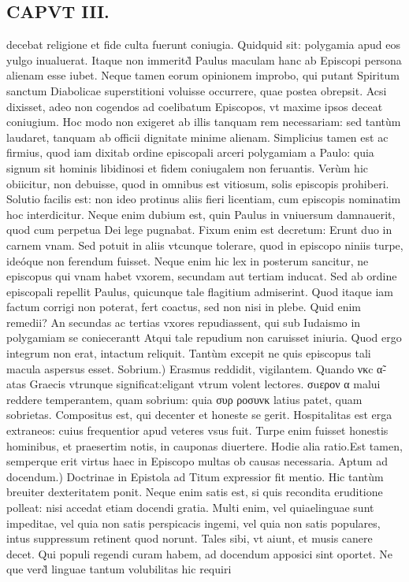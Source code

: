 \documentclass{article}
\begin{document}
\begin{pages}
\section*{CAPVT III. }
\marginpar{[ p.33 ]}\pstart decebat religione et fide culta fuerunt coniugia. Quidquid sit: polygamia apud eos yulgo inualuerat. Itaque non immeritd̀ Paulus maculam hanc ab Episcopi persona alienam esse iubet. Neque tamen eorum opinionem improbo, qui putant Spiritum sanctum Diabolicae superstitioni voluisse occurrere, quae postea obrepsit. Acsi dixisset, adeo non cogendos ad coelibatum Episcopos, vt maxime ipsos deceat coniugium. Hoc modo non exigeret ab illis tanquam rem necessariam: sed tantùm laudaret, tanquam ab officii dignitate minime alienam. Simplicius tamen est ac firmius, quod iam dixitab ordine episcopali arceri polygamiam a Paulo: quia signum sit hominis libidinosi et fidem coniugalem non feruantis. Verùm hic obiicitur, non debuisse, quod in omnibus est vitiosum, solis episcopis prohiberi. Solutio facilis est: non ideo protinus aliis fieri licentiam, cum episcopis nominatim hoc interdicitur. Neque enim dubium est, quin Paulus in vniuersum damnauerit, quod cum perpetua Dei lege pugnabat. Fixum enim est decretum: Erunt duo in carnem vnam. Sed potuit in aliis vtcunque tolerare, quod in episcopo niniis turpe, ideóque non ferendum fuisset. Neque enim hic lex in posterum sancitur, ne episcopus qui vnam habet vxorem, secundam aut tertiam inducat. Sed ab ordine episcopali repellit Paulus, quicunque tale flagitium admiserint. Quod itaque iam factum corrigi non poterat, fert coactus, sed non nisi in plebe. Quid enim remedii? An secundas ac tertias vxores repudiassent, qui sub Iudaismo in polygamiam se coniecerantt Atqui tale repudium non caruisset iniuria. Quod ergo integrum non erat, intactum reliquit. Tantùm excepit ne quis episcopus tali macula aspersus esset.  \pend\pstart Sobrium.) Erasmus reddidit, vigilantem. Quando νκc α̃- atas Graecis vtrunque significat:eligant vtrum volent lectores. σuερον α malui reddere temperantem, quam sobrium: quia συρ ροσυνκ latius patet, quam sobrietas. Compositus est, qui decenter et honeste se gerit. Hospitalitas est erga extraneos: cuius frequentior apud veteres vsus fuit. Turpe enim fuisset honestis hominibus, et praesertim notis, in cauponas diuertere. Hodie alia ratio.Est tamen, semperque erit virtus haec in Episcopo multas ob causas necessaria.  \pend\pstart Aptum ad docendum.) Doctrinae in Epistola ad Titum expressior fit mentio. Hic tantùm breuiter dexteritatem ponit. Neque enim satis est, si quis recondita eruditione polleat: nisi accedat etiam docendi gratia. Multi enim, vel quiaelinguae sunt impeditae, vel quia non satis perspicacis ingemi, vel quia non satis populares, intus suppressum retinent quod norunt. Tales sibi, vt aiunt, et musis canere decet. Qui populi regendi curam habem, ad docendum apposici sint oportet. Ne que verd̀ linguae tantum volubilitas hic requiri\pend

\end{pages}
\end{document}
